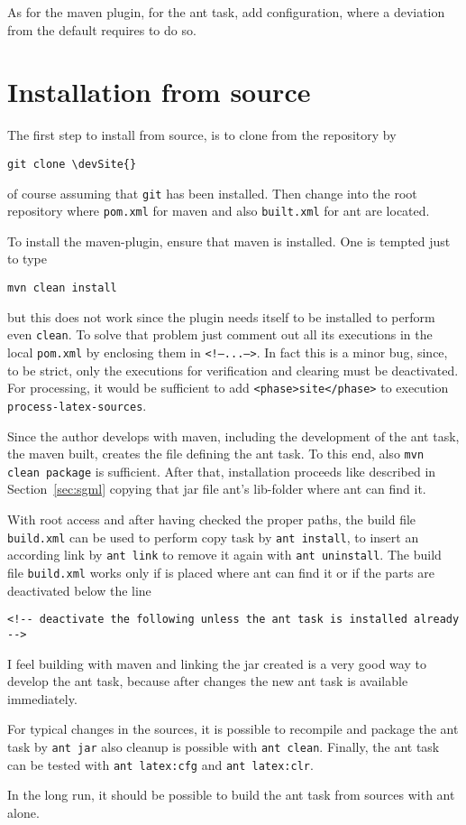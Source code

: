 As for the maven plugin, for the ant task, add configuration, 
where a deviation from the default requires to do so. 



\section{Installation from source}\label{sec:instSrc}

The first step to install from source, is to clone from the repository by
%
\begin{Verbatim}[commandchars=\\\{\}]
git clone \devSite{}
\end{Verbatim}
%
of course assuming that \texttt{git} has been installed.
Then change into the root repository where \texttt{pom.xml}
for maven and also \texttt{built.xml} for ant are located. 

To install the maven-plugin, ensure that maven is installed. 
One is tempted just to type 
%
\begin{Verbatim}
mvn clean install
\end{Verbatim}
%
but this does not work since the plugin needs itself to be installed
to perform even \texttt{clean}.
To solve that problem just comment out all its executions
in the local \texttt{pom.xml} by enclosing them in \texttt{<!--...-->}.
In fact this is a minor bug, since, to be strict, only
the executions for verification and clearing must be deactivated.
For processing, it would be sufficient to add
\texttt{<phase>site</phase>} to execution \texttt{process-latex-sources}.
\medskip


Since the author develops with maven,
including the development of the ant task,
the maven built, creates the file \createdJar{}
defining the ant task.
To this end, also \texttt{mvn clean package} is sufficient.
After that, installation proceeds like described in Section~\ref{sec:sgml}
copying that jar file ant's lib-folder where ant can find it.

With root access and after having checked the proper paths,
the build file \texttt{build.xml} can be used 
to perform copy task by \texttt{ant install},
to insert an according link by \texttt{ant link}
to remove it again with \texttt{ant uninstall}.
The build file \texttt{build.xml} works only
if \createdJar{} is placed where ant can find it
or if the parts are deactivated below the line
%
\begin{Verbatim}
<!-- deactivate the following unless the ant task is installed already -->
\end{Verbatim}

I feel building with maven and linking the jar created
is a very good way to develop the ant task,
because after changes the new ant task is available immediately.

For typical changes in the sources,
it is possible to recompile and package the ant task
by \texttt{ant jar} also cleanup is possible with \texttt{ant clean}.
Finally, the ant task can be tested with \texttt{ant latex:cfg}
and \texttt{ant latex:clr}. 

In the long run, it should be possible to build the ant task from sources
with ant alone.

